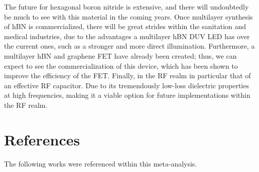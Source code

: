 \documentclass[conference]{IEEEtran}
\begin{document}
The future for hexagonal boron nitride is extensive, and there will undoubtedly be much to see with this material in the coming years. Once multilayer synthesis of hBN is commercialized, there will be great strides within the sanitation and medical industries, due to the advantages a multilayer hBN DUV LED has over the current ones, such as a stronger and more direct illumination. Furthermore, a multilayer hBN and graphene FET have already been created; thus, we can expect to see the commercialization of this device, which has been shown to improve the efficiency of the FET. Finally, in the RF realm in particular that of an effective RF capacitor. Due to its tremendously low-loss dielectric properties at high frequencies, making it a viable option for future implementations within the RF realm.

\section*{References}

The following works were referenced within this meta-analysis.
\end{document}

